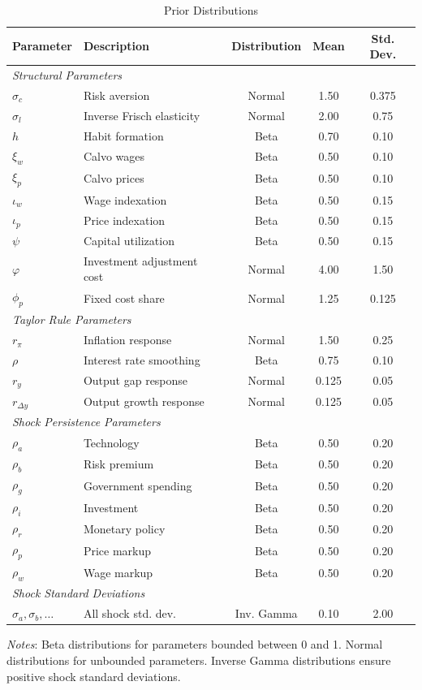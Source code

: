 \documentclass[12pt]{article}
\begin{document}
\begin{table}[H]
\centering
\caption{Prior Distributions}
\label{tab:priors}
\scriptsize
\setlength{\tabcolsep}{3pt}
\renewcommand{\arraystretch}{0.85}
\begin{tabular}{@{}llccc@{}}
\toprule
Parameter & Description & Distribution & Mean & Std. Dev. \\
\midrule
\multicolumn{5}{l}{\textit{Structural Parameters}} \\
$\sigma_c$ & Risk aversion & Normal & 1.50 & 0.375 \\
$\sigma_l$ & Inverse Frisch elasticity & Normal & 2.00 & 0.75 \\
$h$ & Habit formation & Beta & 0.70 & 0.10 \\
$\xi_w$ & Calvo wages & Beta & 0.50 & 0.10 \\
$\xi_p$ & Calvo prices & Beta & 0.50 & 0.10 \\
$\iota_w$ & Wage indexation & Beta & 0.50 & 0.15 \\
$\iota_p$ & Price indexation & Beta & 0.50 & 0.15 \\
$\psi$ & Capital utilization & Beta & 0.50 & 0.15 \\
$\varphi$ & Investment adjustment cost & Normal & 4.00 & 1.50 \\
$\phi_p$ & Fixed cost share & Normal & 1.25 & 0.125 \\[2pt]
\multicolumn{5}{l}{\textit{Taylor Rule Parameters}} \\
$r_\pi$ & Inflation response & Normal & 1.50 & 0.25 \\
$\rho$ & Interest rate smoothing & Beta & 0.75 & 0.10 \\
$r_y$ & Output gap response & Normal & 0.125 & 0.05 \\
$r_{\Delta y}$ & Output growth response & Normal & 0.125 & 0.05 \\[2pt]
\multicolumn{5}{l}{\textit{Shock Persistence Parameters}} \\
$\rho_a$ & Technology & Beta & 0.50 & 0.20 \\
$\rho_b$ & Risk premium & Beta & 0.50 & 0.20 \\
$\rho_g$ & Government spending & Beta & 0.50 & 0.20 \\
$\rho_i$ & Investment & Beta & 0.50 & 0.20 \\
$\rho_r$ & Monetary policy & Beta & 0.50 & 0.20 \\
$\rho_p$ & Price markup & Beta & 0.50 & 0.20 \\
$\rho_w$ & Wage markup & Beta & 0.50 & 0.20 \\[2pt]
\multicolumn{5}{l}{\textit{Shock Standard Deviations}} \\
$\sigma_a, \sigma_b, \ldots$ & All shock std. dev. & Inv. Gamma & 0.10 & 2.00 \\
\bottomrule
\end{tabular}
\vspace{0.3em}

\noindent\scriptsize\textit{Notes}: Beta distributions for parameters bounded between 0 and 1. Normal distributions for unbounded parameters. Inverse Gamma distributions ensure positive shock standard deviations.
\end{table}
\end{document}
